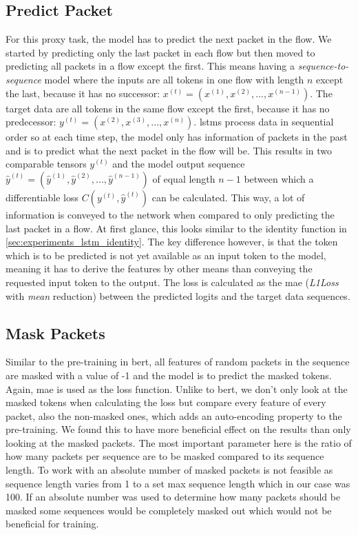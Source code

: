 \subsection{Predict Packet} \label{sec:experiments:lstm:predict_packet}

For this proxy task, the model has to predict the next packet in the flow. We started by predicting only the last packet in each flow but then moved to predicting all packets in a flow except the first. This means having a \textit{sequence-to-sequence} model where the inputs are all tokens in one flow with length $n$ except the last, because it has no successor: $x^{(t)} = (x^{(1)}, x^{(2)}, ..., x^{(n-1)})$. The target data are all tokens in the same flow except the first, because it has no predecessor: $y^{(t)} = (x^{(2)}, x^{(3)}, ..., x^{(n)})$. \glspl{lstm} process data in sequential order so at each time step, the model only has information of packets in the past and is to predict what the next packet in the flow will be. This results in two comparable tensors $y^{(t)}$ and the model output sequence $\hat{y}^{(t)} = (\hat{y}^{(1)}, \hat{y}^{(2)}, ..., \hat{y}^{(n-1)})$ of equal length $n-1$ between which a differentiable loss $C(y^{(t)},\hat{y}^{(t)})$ can be calculated. This way, a lot of information is conveyed to the network when compared to only predicting the last packet in a flow. At first glance, this looks similar to the identity function in \ref{sec:experiments_lstm_identity}. The key difference however, is that the token which is to be predicted is not yet available as an input token to the model, meaning it has to derive the features by other means than conveying the requested input token to the output. The loss is calculated as the \gls{mae} (\textit{L1Loss} with \textit{mean} reduction) between the predicted logits and the target data sequences.

\subsection{Mask Packets} \label{sec:experiments:lstm:mask_packet}

Similar to the pre-training in \gls{bert}, all features of random packets in the sequence are masked with a value of -1 and the model is to predict the masked tokens. Again, \gls{mae} is used as the loss function. Unlike to \gls{bert}, we don't only look at the masked tokens when calculating the loss but compare every feature of every packet, also the non-masked ones, which adds an auto-encoding property to the pre-training. We found this to have more beneficial effect on the results than only looking at the masked packets. The most important parameter here is the ratio of how many packets per sequence are to be masked compared to its sequence length. To work with an absolute number of masked packets is not feasible as sequence length varies from 1 to a set max sequence length which in our case was 100. If an absolute number was used to determine how many packets should be masked some sequences would be completely masked out which would not be beneficial for training.


